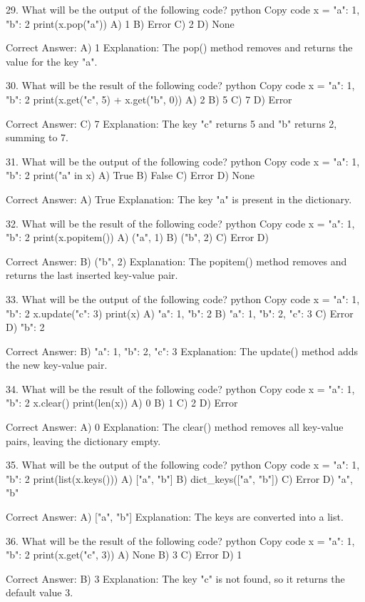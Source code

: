 29. What will be the output of the following code?
python
Copy code
x = {"a": 1, "b": 2}
print(x.pop("a"))
A) 1
B) Error
C) 2
D) None

Correct Answer: A) 1
Explanation: The pop() method removes and returns the value for the key "a".

30. What will be the result of the following code?
python
Copy code
x = {"a": 1, "b": 2}
print(x.get("c", 5) + x.get("b", 0))
A) 2
B) 5
C) 7
D) Error

Correct Answer: C) 7
Explanation: The key "c" returns 5 and "b" returns 2, summing to 7.

31. What will be the output of the following code?
python
Copy code
x = {"a": 1, "b": 2}
print("a" in x)
A) True
B) False
C) Error
D) None

Correct Answer: A) True
Explanation: The key "a" is present in the dictionary.

32. What will be the result of the following code?
python
Copy code
x = {"a": 1, "b": 2}
print(x.popitem())
A) ("a", 1)
B) ("b", 2)
C) Error
D) {}

Correct Answer: B) ("b", 2)
Explanation: The popitem() method removes and returns the last inserted key-value pair.

33. What will be the output of the following code?
python
Copy code
x = {"a": 1, "b": 2}
x.update({"c": 3})
print(x)
A) {"a": 1, "b": 2}
B) {"a": 1, "b": 2, "c": 3}
C) Error
D) {"b": 2}

Correct Answer: B) {"a": 1, "b": 2, "c": 3}
Explanation: The update() method adds the new key-value pair.

34. What will be the result of the following code?
python
Copy code
x = {"a": 1, "b": 2}
x.clear()
print(len(x))
A) 0
B) 1
C) 2
D) Error

Correct Answer: A) 0
Explanation: The clear() method removes all key-value pairs, leaving the dictionary empty.

35. What will be the output of the following code?
python
Copy code
x = {"a": 1, "b": 2}
print(list(x.keys()))
A) ["a", "b"]
B) dict_keys(["a", "b"])
C) Error
D) {"a", "b"}

Correct Answer: A) ["a", "b"]
Explanation: The keys are converted into a list.

36. What will be the result of the following code?
python
Copy code
x = {"a": 1, "b": 2}
print(x.get("c", 3))
A) None
B) 3
C) Error
D) 1

Correct Answer: B) 3
Explanation: The key "c" is not found, so it returns the default value 3.


